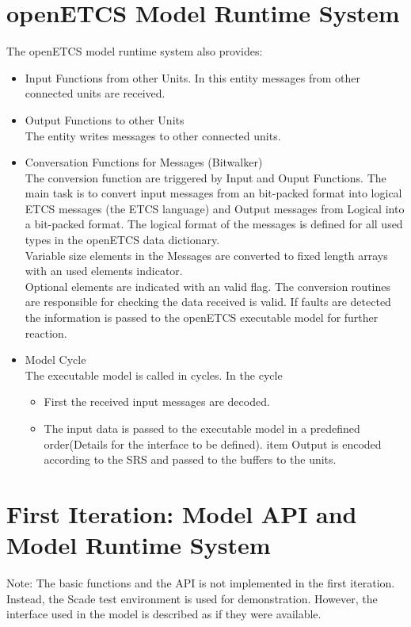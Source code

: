 \documentclass{template/openetcs_report}
\begin{document}
\section{openETCS Model Runtime System}
The openETCS model runtime system also provides:

\begin{itemize}
\item Input Functions from other Units.
In this entity messages from other connected units are received.
\item Output Functions to other Units\\
The entity writes messages to other connected units.
\item Conversation Functions for Messages (Bitwalker)\\
The conversion function are triggered by Input and Ouput Functions. The main task is to convert input messages from an bit-packed format into logical ETCS messages (the ETCS language) and Output messages from Logical into a bit-packed format. The logical format of the messages is defined for all used types in the openETCS data dictionary. \\
Variable size elements in the Messages are converted to fixed length arrays with an used elements indicator.\\
Optional elements are indicated with an valid flag.
The conversion routines are responsible for checking the data received is valid. If  faults are detected the information is passed to the openETCS executable model for further reaction. 
\item Model Cycle\\
The executable model is called in cycles. In the cycle 
\begin{itemize}
\item First the received input messages are decoded.
\item The input data is passed to the executable model in a predefined order(Details for the interface to be defined).
item Output is encoded according to the SRS and passed to the  buffers to the units.
\end{itemize}

\end{itemize}




\section{First Iteration: Model API and Model Runtime System}
Note: The basic functions and the API is not implemented in the first iteration. Instead, the Scade test environment is used for demonstration. However, the interface used in the model is described as if they were available.
\end{document}
